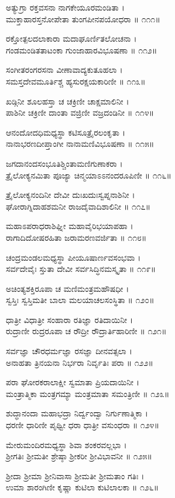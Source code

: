 ಅತ್ಯುಗ್ರಾ ರಕ್ತವಸನಾ ನಾಗಕೇಯೂರಮಂಡಿತಾ ।\\
ಮುಕ್ತಾಹಾರಸ್ತನೋಪೇತಾ ತುಂಗಪೀನಪಯೋಧರಾ ॥ ೧೧೧॥

ರಕ್ತೋತ್ಪಲದಲಾಕಾರಾ ಮದಾಘೂರ್ಣಿತಲೋಚನಾ ।\\
ಗಂಡಮಂಡಿತತಾಟಂಕಾ ಗುಂಜಾಹಾರವಿಭೂಷಣಾ ॥ ೧೧೨॥

ಸಂಗೀತರಂಗರಸನಾ ವೀಣಾವಾದ್ಯಕುತೂಹಲಾ ।\\
ಸಮಸ್ತದೇವಮೂರ್ತಿಶ್ಚ ಹ್ಯಸುರಕ್ಷಯಕಾರಿಣೀ ॥ ೧೧೩॥

ಖಡ್ಗಿನೀ ಶೂಲಹಸ್ತಾ ಚ ಚಕ್ರಿಣೀ ಚಾಕ್ಷಮಾಲಿನೀ ।\\
ಪಾಶಿನೀ ಚಕ್ರಿಣೀ ದಾಂತಾ ವಜ್ರಿಣೀ ವಜ್ರದಂಡಿನೀ ॥ ೧೧೪॥

ಆನಂದೋದಧಿಮಧ್ಯಸ್ಥಾ ಕಟಿಸೂತ್ರೈರಲಂಕೃತಾ ।\\
ನಾನಾಭರಣದೀಪ್ತಾಂಗೀ ನಾನಾಮಣಿವಿಭೂಷಣಾ ॥ ೧೧೫॥

ಜಗದಾನಂದಸಂಭೂತಿಶ್ಚಿಂತಾಮಣಿಗುಣಾಕರಾ ।\\
ತ್ರೈಲೋಕ್ಯನಮಿತಾ ಪೂಜ್ಯಾ ಚಿನ್ಮಯಾಽಽನಂದರೂಪಿಣೀ ॥ ೧೧೬॥

ತ್ರೈಲೋಕ್ಯನಂದಿನೀ ದೇವೀ ದುಃಖದುಃಸ್ವಪ್ನನಾಶಿನೀ ।\\
ಘೋರಾಗ್ನಿದಾಹಶಮನೀ ರಾಜದೈವಾದಿಶಾಲಿನೀ ॥ ೧೧೭॥

ಮಹಾಽಪರಾಧರಾಶಿಘ್ನೀ ಮಹಾವೈರಿಭಯಾಪಹಾ ।\\
ರಾಗಾದಿದೋಷರಹಿತಾ ಜರಾಮರಣವರ್ಜಿತಾ ॥ ೧೧೮॥

ಚಂದ್ರಮಂಡಲಮಧ್ಯಸ್ಥಾ ಪೀಯೂಷಾರ್ಣವಸಂಭವಾ ।\\
ಸರ್ವದೇವೈಃ ಸ್ತುತಾ ದೇವೀ ಸರ್ವಸಿದ್ಧಿನಮಸ್ಕೃತಾ ॥ ೧೧೯॥

ಅಚಿಂತ್ಯಶಕ್ತಿರೂಪಾ ಚ ಮಣಿಮಂತ್ರಮಹೌಷಧೀ ।\\
ಸ್ವಸ್ತಿಃ ಸ್ವಸ್ತಿಮತೀ ಬಾಲಾ ಮಲಯಾಚಲಸಂಸ್ಥಿತಾ ॥ ೧೨೦॥

ಧಾತ್ರೀ ವಿಧಾತ್ರೀ ಸಂಹಾರಾ ರತಿಜ್ಞಾ ರತಿದಾಯಿನೀ ।\\
ರುದ್ರಾಣೀ ರುದ್ರರೂಪಾ ಚ ರೌದ್ರೀ ರೌದ್ರಾರ್ತಿಹಾರಿಣೀ ॥ ೧೨೧॥

ಸರ್ವಜ್ಞಾ ಚೌರಧರ್ಮಜ್ಞಾ ರಸಜ್ಞಾ ದೀನವತ್ಸಲಾ ।\\
ಅನಾಹತಾ ತ್ರಿನಯನಾ ನಿರ್ಭರಾ ನಿರ್ವೃತಿಃ ಪರಾ ॥ ೧೨೨॥

ಪರಾ ಘೋರಕರಾಲಾಕ್ಷೀ ಸ್ವಮಾತಾ ಪ್ರಿಯದಾಯಿನೀ ।\\
ಮಂತ್ರಾತ್ಮಿಕಾ ಮಂತ್ರಗಮ್ಯಾ ಮಂತ್ರಮಾತಾ ಸಮಂತ್ರಿಣೀ ॥ ೧೨೩॥

ಶುದ್ಧಾನಂದಾ ಮಹಾಭದ್ರಾ ನಿರ್ದ್ವಂದ್ವಾ ನಿರ್ಗುಣಾತ್ಮಿಕಾ ।\\
ಧರಣೀ ಧಾರಿಣೀ ಪೃಥ್ವೀ ಧರಾ ಧಾತ್ರೀ ವಸುಂಧರಾ ॥ ೧೨೪॥

ಮೇರುಮಂದಿರಮಧ್ಯಸ್ಥಾ ಶಿವಾ ಶಂಕರವಲ್ಲಭಾ ।\\
ಶ್ರೀಗತಿಃ ಶ್ರೀಮತೀ ಶ್ರೇಷ್ಠಾ ಶ್ರೀಕರೀ ಶ್ರೀವಿಭಾವನೀ ॥ ೧೨೫॥

ಶ್ರೀದಾ ಶ್ರೀಮಾ ಶ್ರೀನಿವಾಸಾ ಶ್ರೀಮತೀ ಶ್ರೀಮತಾಂ ಗತಿಃ ।\\
ಉಮಾ ಶಾರಂಗಿಣೀ ಕೃಷ್ಣಾ ಕುಟಿಲಾ ಕುಟಿಲಾಲಕಾ ॥ ೧೨೬॥

